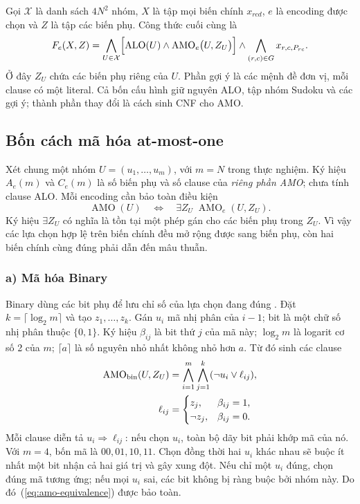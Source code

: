 \documentclass[a4paper]{cas-sc}
\newcommand{\ALO}{\operatorname{ALO}}
\newcommand{\AMO}{\operatorname{AMO}}
\begin{document}
Gọi $\mathcal X$ là danh sách $4N^2$ nhóm, $X$ là tập mọi biến chính $x_{rcd}$, $e$ là encoding được chọn và $Z$ là tập các biến phụ. Công thức cuối cùng là
\begin{equation}\label{eq:cnf}
F_e(X,Z)=\bigwedge_{U\in\mathcal X}
\Bigl[\ALO(U)\land\AMO_e\bigl(U,Z_U\bigr)\Bigr]
\land\bigwedge_{(r,c)\in G}x_{r,c,P_{rc}}.
\end{equation}
Ở đây $Z_U$ chứa các biến phụ riêng của $U$. Phần gợi ý là các mệnh đề đơn vị, mỗi clause có một literal. Cả bốn cấu hình giữ nguyên ALO, tập nhóm Sudoku và các gợi ý; thành phần thay đổi là cách sinh CNF cho AMO.

\subsection{Bốn cách mã hóa at-most-one}
Xét chung một nhóm $U=(u_1,\ldots,u_m)$, với $m=N$ trong thực nghiệm. Ký hiệu $A_e(m)$ và $C_e(m)$ là số biến phụ và số clause của \emph{riêng phần AMO}; chưa tính clause ALO. Mỗi encoding cần bảo toàn điều kiện
\begin{equation}\label{eq:amo-equivalence}
\AMO(U)\quad\Longleftrightarrow\quad
\exists Z_U\;\AMO_e(U,Z_U).
\end{equation}
Ký hiệu $\exists Z_U$ có nghĩa là tồn tại một phép gán cho các biến phụ trong $Z_U$. Vì vậy các lựa chọn hợp lệ trên biến chính đều mở rộng được sang biến phụ, còn hai biến chính cùng đúng phải dẫn đến mâu thuẫn.

\newpage
\subsubsection*{a) Mã hóa Binary}
Binary dùng các bit phụ để lưu chỉ số của lựa chọn đang đúng \citep{frisch2010}. Đặt $k=\lceil\log_2m\rceil$ và tạo $z_1,\ldots,z_k$. Gán $u_i$ mã nhị phân của $i-1$; bit là một chữ số nhị phân thuộc $\{0,1\}$. Ký hiệu $\beta_{ij}$ là bit thứ $j$ của mã này; $\log_2 m$ là logarit cơ số 2 của $m$; $\lceil a\rceil$ là số nguyên nhỏ nhất không nhỏ hơn $a$. Từ đó sinh các clause
\begin{equation}\label{eq:binary}
\begin{aligned}
\AMO_{\rm bin}(U,Z_U)
 &=\bigwedge_{i=1}^{m}\bigwedge_{j=1}^{k}(\neg u_i\lor\ell_{ij}),\\
\ell_{ij}&=\begin{cases}
z_j,&\beta_{ij}=1,\\
\neg z_j,&\beta_{ij}=0.
\end{cases}
\end{aligned}
\end{equation}
Mỗi clause diễn tả $u_i\Rightarrow\ell_{ij}$: nếu chọn $u_i$, toàn bộ dãy bit phải khớp mã của nó. Với $m=4$, bốn mã là $00,01,10,11$. Chọn đồng thời hai $u_i$ khác nhau sẽ buộc ít nhất một bit nhận cả hai giá trị và gây xung đột. Nếu chỉ một $u_i$ đúng, chọn đúng mã tương ứng; nếu mọi $u_i$ sai, các bit không bị ràng buộc bởi nhóm này. Do đó~(\ref{eq:amo-equivalence}) được bảo toàn.
\end{document}
